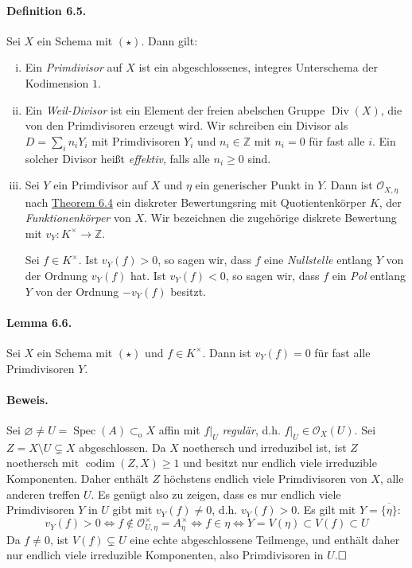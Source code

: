 \documentclass[11pt,b5paper,openany]{memoir}
\def \qed {$\hfill\square$}
\begin{document}
\paragraph{Definition 6.5.}\label{6.5} Sei $X$ ein Schema mit $(\star)$. Dann gilt:
\begin{enumerate}[(i)]
\item Ein \textit{Primdivisor} auf $X$ ist ein abgeschlossenes, integres Unterschema der Kodimension $1$.
\item Ein \textit{Weil-Divisor} ist ein Element der freien abelschen Gruppe $\operatorname{Div}(X)$, die von den Primdivisoren erzeugt wird. Wir schreiben ein Divisor als $D=\sum_i n_iY_i$ mit Primdivisoren $Y_i$ und $n_i\in\mathbb{Z}$ mit $n_i=0$ für fast alle $i$. Ein solcher Divisor heißt \textit{effektiv}, falls alle $n_i\geq 0$ sind.
\item Sei $Y$ ein Primdivisor auf $X$ und $\eta$ ein generischer Punkt in $Y$. Dann ist $\mathcal{O}_{X,\eta}$ nach \hyperref[6.4]{Theorem 6.4} ein diskreter Bewertungsring mit Quotientenkörper $K$, der \textit{Funktionenkörper} von $X$. Wir bezeichnen die zugehörige diskrete Bewertung mit  $v_Y:K^\times\to\mathbb{Z}$. 

Sei $f\in K^\times$. Ist $v_Y(f)>0$, so sagen wir, dass $f$ eine \textit{Nullstelle} entlang $Y$ von der Ordnung $v_Y(f)$ hat. Ist $v_Y(f)<0$, so sagen wir, dass $f$ ein \textit{Pol} entlang $Y$ von der Ordnung $-v_Y(f)$ besitzt.
\end{enumerate}

\paragraph{Lemma 6.6.}\label{6.6} Sei $X$ ein Schema mit $(\star)$ und $f\in K^\times$. Dann ist $v_Y(f)=0$ für fast alle Primdivisoren $Y$.

\paragraph{Beweis.} Sei $\varnothing \neq U = \operatorname{Spec}(A)\subset_\text{o}X$ affin mit $f|_U$ \textit{regulär}, d.h. $f|_U\in\mathcal{O}_X(U)$. Sei $Z=X\setminus U\subsetneq X$ abgeschlossen. Da $X$ noethersch und irreduzibel ist, ist $Z$ noethersch mit $\operatorname{codim}(Z,X)\geq 1$ und besitzt nur endlich viele irreduzible Komponenten. Daher enthält $Z$ höchstens endlich viele Primdivisoren von $X$, alle anderen treffen $U$. Es genügt also zu zeigen, dass es nur endlich viele Primdivisoren $Y$ in $U$ gibt mit $v_Y(f)\neq 0$, d.h. $v_Y(f)>0$. Es gilt mit $Y=\overline{\{ \eta\}}$:
\[v_Y(f)>0\iff f\not\in\mathcal{O}_{U,\eta}^\times=A_\eta^\times\iff f\in\eta\iff Y=V(\eta)\subset V(f)\subset U \]
Da $f\neq 0$, ist $V(f)\subsetneq U$ eine echte abgeschlossene Teilmenge, und enthält daher nur endlich viele irreduzible Komponenten, also Primdivisoren in $U$.\qed
\end{document}
